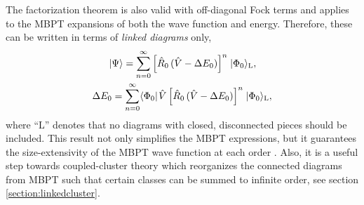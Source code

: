 \documentclass[thesis.tex]{subfiles}
\begin{document}
The factorization theorem is also valid with off-diagonal Fock terms and applies to the MBPT expansions of both the wave function and energy.  Therefore, these can be written in terms of \textit{linked diagrams} only,
\begin{gather} \label{eq:linked_MBPT}
  \hspace{1pt}\lvert \Psi \rangle = \sum_{n=0}^{\infty}\left[\hat{R}_{0}\mathop{(\hat{V} - \Delta E_{0})}\right]^{n}\hspace{1pt}\lvert \Phi_{0} \rangle_{\mathrm{L}}, \\
  \Delta E_{0} = \sum_{n=0}^{\infty}\langle \Phi_{0} |\hspace{1pt}\hat{V}\left[\hat{R}_{0}\mathop{(\hat{V} - \Delta E_{0})}\right]^{n}\hspace{1pt}\lvert \Phi_{0} \rangle_{\mathrm{L}},
\end{gather}
where ``$\mathrm{L}$'' denotes that no diagrams with closed, disconnected pieces should be included.  This result not only simplifies the MBPT expressions, but it guarantees the size-extensivity of the MBPT wave function at each order \cite{SHAVITT2009}.  Also, it is a useful step towards coupled-cluster theory which reorganizes the connected diagrams from MBPT such that certain classes can be summed to infinite order, see section \ref{section:linkedcluster}.
\end{document}
